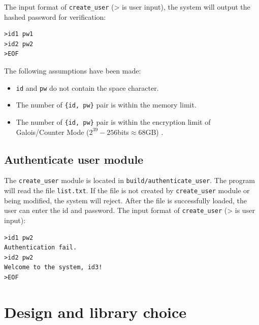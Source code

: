 \documentclass[journal]{IEEEtran}
\begin{document}
The input format of \texttt{create\_user} (> is user input), the system will output the hashed password for verification:
\begin{lstlisting}
>id1 pw1
>id2 pw2
>EOF
\end{lstlisting}
The following assumptions have been made:
\begin{itemize}
\item \texttt{id} and \texttt{pw} do not contain the space character.
\item The number of \texttt{\{id, pw\}} pair is within the memory limit.
\item The number of \texttt{\{id, pw\}} pair is within the encryption limit of Galois/Counter Mode ($2^{39} -  256$bits$\approx 68$GB) \cite{GCMNIST}.
\end{itemize}

\subsection{Authenticate user module}
The \texttt{create\_user} module is located in \texttt{build/authenticate\_user}. The program will read the file \texttt{list.txt}. If the file is not created by \texttt{create\_user} module or being modified, the system will reject. After the file is successfully loaded, the user can enter the id and password.
The input format of \texttt{create\_user} (> is user input):
\begin{lstlisting}
>id1 pw2
Authentication fail.
>id2 pw2
Welcome to the system, id3!
>EOF
\end{lstlisting}
\section{Design and library choice}
\label{Section:AE}
\end{document}
